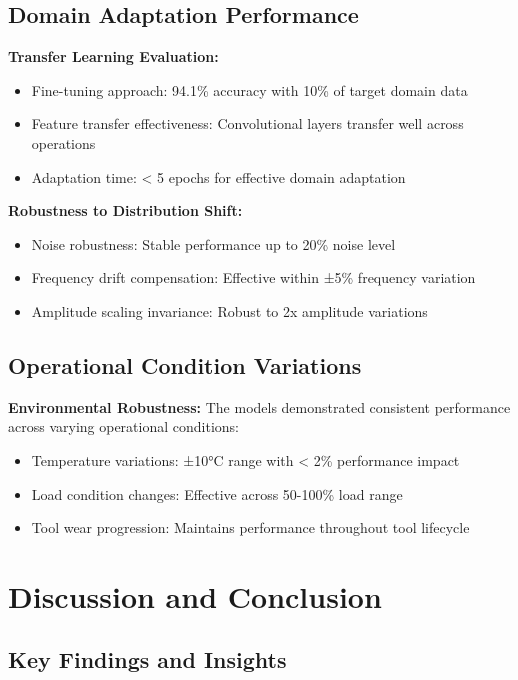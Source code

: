 \documentclass[12pt]{article}
\begin{document}
\subsection{Domain Adaptation Performance}

\textbf{Transfer Learning Evaluation:}
\begin{itemize}
    \item Fine-tuning approach: 94.1\% accuracy with 10\% of target domain data
    \item Feature transfer effectiveness: Convolutional layers transfer well across operations
    \item Adaptation time: < 5 epochs for effective domain adaptation
\end{itemize}

\textbf{Robustness to Distribution Shift:}
\begin{itemize}
    \item Noise robustness: Stable performance up to 20\% noise level
    \item Frequency drift compensation: Effective within ±5\% frequency variation
    \item Amplitude scaling invariance: Robust to 2x amplitude variations
\end{itemize}

\subsection{Operational Condition Variations}

\textbf{Environmental Robustness:}
The models demonstrated consistent performance across varying operational conditions:
\begin{itemize}
    \item Temperature variations: ±10°C range with < 2\% performance impact
    \item Load condition changes: Effective across 50-100\% load range
    \item Tool wear progression: Maintains performance throughout tool lifecycle
\end{itemize}

\section{Discussion and Conclusion}

\subsection{Key Findings and Insights}
\end{document}

